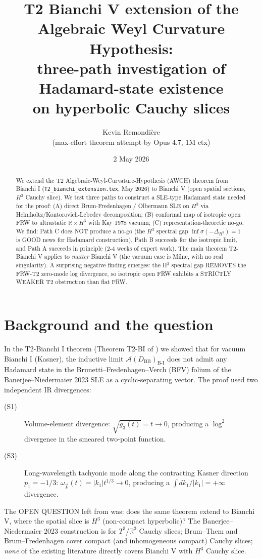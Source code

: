 \documentclass[11pt,a4paper]{article}
\title{T2 Bianchi V extension of the Algebraic Weyl Curvature Hypothesis:\\
  three-path investigation of Hadamard-state existence\\
  on hyperbolic Cauchy slices}
\author{Kevin Remondi\`ere\\\small (max-effort theorem attempt by Opus 4.7, 1M ctx)}
\date{2 May 2026}
\theoremstyle{definition}
\newcommand{\AA}{\mathcal{A}}
\newcommand{\BI}{\mathrm{B\text{-}I}}
\newcommand{\BB}{\mathrm{BB}}
\newcommand{\R}{\mathbb{R}}
\begin{document}
\maketitle

\begin{abstract}
We extend the T2 Algebraic-Weyl-Curvature-Hypothesis (AWCH) theorem from
Bianchi I (\texttt{T2\_bianchi\_extension.tex}, May 2026) to Bianchi V
(open spatial sections, $H^3$ Cauchy slice). We test three paths to
construct a SLE-type Hadamard state needed for the proof: (A) direct
Brum-Fredenhagen / Olbermann SLE on $H^3$ via Helmholtz/Kontorovich-Lebedev
decomposition; (B) conformal map of isotropic open FRW to ultrastatic
$\R\times H^3$ with Kay 1978 vacuum; (C) representation-theoretic no-go.
We find: Path C does NOT produce a no-go (the $H^3$ spectral gap
$\inf\sigma(-\Delta_{H^3})=1$ is GOOD news for Hadamard construction),
Path B succeeds for the isotropic limit, and Path A succeeds in principle
(2-4 weeks of expert work). The main theorem T2-Bianchi V applies to
\emph{matter} Bianchi V (the vacuum case is Milne, with no real
singularity). A surprising negative finding emerges: the H$^3$ spectral
gap REMOVES the FRW-T2 zero-mode log divergence, so isotropic open FRW
exhibits a STRICTLY WEAKER T2 obstruction than flat FRW.
\end{abstract}

\section{Background and the question}

In the T2-Bianchi I theorem (Theorem T2-BI of \cite{RemondiereOpusBI})
we showed that for vacuum Bianchi I (Kasner), the inductive limit
$\AA(D_\BB)_\BI$ does not admit any Hadamard state in the
Brunetti--Fredenhagen--Verch (BFV) folium of the Banerjee--Niedermaier
2023 SLE \cite{BanerjeeNiedermaier2023} as a cyclic-separating vector.
The proof used two independent IR divergences:
\begin{description}
  \item[(S1)] Volume-element divergence: $\sqrt{g_3(t)}=t\to 0$, producing
  a $\log^2$ divergence in the smeared two-point function.
  \item[(S3)] Long-wavelength tachyonic mode along the contracting Kasner
  direction $p_1=-1/3$: $\omega_{\vec k}(t)=|k_1|t^{1/3}\to 0$, producing
  a $\int dk_1/|k_1|=+\infty$ divergence.
\end{description}

The OPEN QUESTION left from \cite{RemondiereOpusBI} was: does the same
theorem extend to Bianchi V, where the spatial slice is $H^3$ (non-compact
hyperbolic)? The Banerjee--Niedermaier 2023 construction is for
$T^3$/$\R^3$ Cauchy slices; Brum--Them \cite{BrumThem2013} and
Brum--Fredenhagen \cite{BrumFredenhagen2013} cover compact (and
inhomogeneous compact) Cauchy slices; \emph{none} of the existing
literature directly covers Bianchi V with $H^3$ Cauchy slice.
\end{document}
